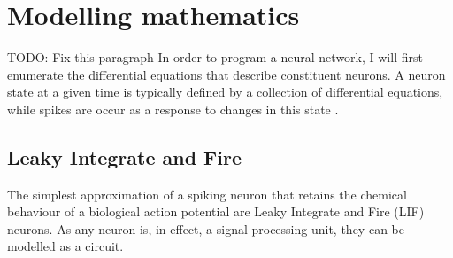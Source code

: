 \section{Modelling mathematics}

TODO: Fix this paragraph
In order to program a neural network, I will first enumerate the differential
equations that describe constituent neurons. A neuron state at a given time is
typically defined by a collection of differential equations, while spikes are
occur as a response to changes in this state
\autocite{brette_simulation_2007}.


\subsection{Leaky Integrate and Fire}

The simplest approximation of a spiking neuron that retains the chemical
behaviour of a biological action potential are Leaky Integrate and Fire (LIF) neurons. As any neuron is, in effect, a
signal processing unit, they can be modelled as a circuit.

